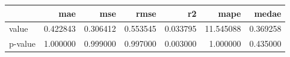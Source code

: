 \begin{tabular}{lrrrrrr}
\toprule
 & mae & mse & rmse & r2 & mape & medae \\
\midrule
value & 0.422843 & 0.306412 & 0.553545 & 0.033795 & 11.545088 & 0.369258 \\
p-value & 1.000000 & 0.999000 & 0.997000 & 0.003000 & 1.000000 & 0.435000 \\
\bottomrule
\end{tabular}
